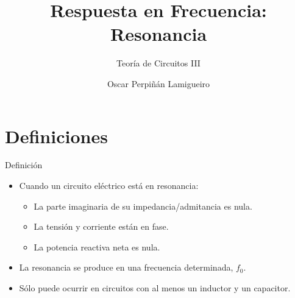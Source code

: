 \documentclass[aspectratio=169, usenames,svgnames,dvipsnames]{beamer}
\author{Oscar Perpiñán Lamigueiro}
\date{}
\title{Respuesta en Frecuencia: Resonancia}
\subtitle{Teoría de Circuitos III}
\begin{document}
\maketitle

\section{Definiciones}
\label{sec:org98cdcd8}
\begin{frame}[label={sec:org333bb7e}]{Definición}
\begin{itemize}
\item Cuando un circuito eléctrico está en resonancia:
\begin{itemize}
\item La \alert{parte imaginaria} de su impedancia/admitancia es \alert{nula}.
\item La \alert{tensión y corriente} están en \alert{fase}.
\item La \alert{potencia reactiva} neta es \alert{nula}.
\end{itemize}
\item La resonancia se produce en una \alert{frecuencia determinada}, \(f_0\).
\item Sólo puede ocurrir en circuitos con \alert{al menos un inductor y un capacitor}.
\end{itemize}
\end{frame}
\end{document}
